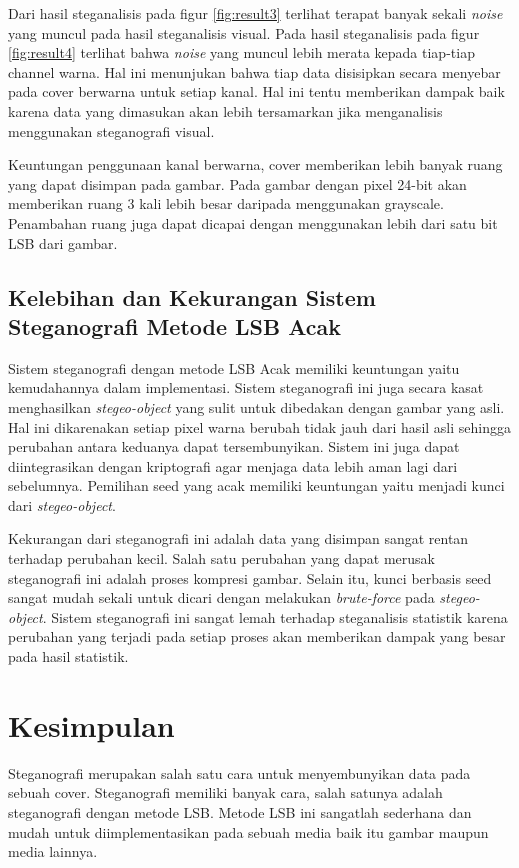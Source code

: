 \documentclass[10pt,conference]{IEEEtran}
\theoremstyle{definition}
\begin{document}
Dari hasil steganalisis pada figur \ref{fig:result3} terlihat terapat banyak sekali \emph{noise} yang muncul pada hasil steganalisis visual. 
Pada hasil steganalisis pada figur \ref{fig:result4} terlihat bahwa \emph{noise} yang muncul lebih merata kepada tiap-tiap channel warna.
Hal ini menunjukan bahwa tiap data disisipkan secara menyebar pada cover berwarna untuk setiap kanal. Hal ini tentu memberikan dampak baik karena
data yang dimasukan akan lebih tersamarkan jika menganalisis menggunakan steganografi visual.

Keuntungan penggunaan kanal berwarna, cover memberikan lebih banyak ruang yang dapat disimpan pada gambar. Pada gambar dengan pixel 24-bit akan memberikan ruang 3 kali lebih
besar daripada menggunakan grayscale. Penambahan ruang juga dapat dicapai dengan menggunakan lebih dari satu bit LSB dari gambar.

\subsection{Kelebihan dan Kekurangan Sistem Steganografi Metode LSB Acak}

Sistem steganografi dengan metode LSB Acak memiliki keuntungan yaitu kemudahannya dalam implementasi. Sistem steganografi ini juga secara kasat menghasilkan \emph{stegeo-object} yang sulit untuk dibedakan dengan gambar
yang asli. Hal ini dikarenakan setiap pixel warna berubah tidak jauh dari hasil asli sehingga perubahan antara keduanya dapat tersembunyikan. Sistem ini juga dapat diintegrasikan dengan kriptografi agar menjaga data
lebih aman lagi dari sebelumnya. Pemilihan seed yang acak memiliki keuntungan yaitu menjadi kunci dari \emph{stegeo-object}.

Kekurangan dari steganografi ini adalah data yang disimpan sangat rentan terhadap perubahan kecil. Salah satu perubahan yang dapat merusak steganografi ini adalah proses kompresi gambar. Selain itu, kunci berbasis seed
sangat mudah sekali untuk dicari dengan melakukan \emph{brute-force} pada \emph{stegeo-object}. Sistem steganografi ini sangat lemah terhadap steganalisis statistik karena perubahan yang terjadi pada setiap proses akan
memberikan dampak yang besar pada hasil statistik.

\section{Kesimpulan}
Steganografi merupakan salah satu cara untuk menyembunyikan data pada sebuah cover. Steganografi memiliki banyak cara, salah satunya adalah steganografi dengan metode LSB. Metode LSB ini sangatlah sederhana dan mudah
untuk diimplementasikan pada sebuah media baik itu gambar maupun media lainnya. 
\end{document}
